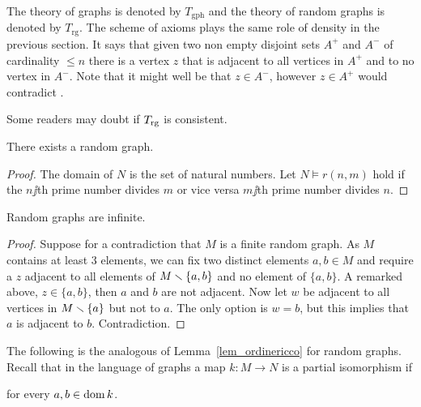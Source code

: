 \documentclass[creche.tex]{subfiles}
\begin{document}
The theory of graphs is denoted by \emph{$T_{\textrm{gph}}$} and the theory of random graphs is denoted by \emph{$T_{\textrm{rg}}$}. The scheme of axioms  plays the same role of density in the previous section.  It says that given two non empty disjoint sets $A^+$ and $A^-$ of cardinality $\le n$ there is a vertex $z$ that is adjacent to all vertices in $A^+$ and to no vertex in $A^-$. Note that it might well be that $z\in A^-$, however $z\in A^+$ would contradict .

Some readers may doubt if $T_{\rm rg}$ is consistent.

\begin{proposition}
There exists a random graph.
\end{proposition}
\begin{proof}
The domain of $N$ is the set of natural numbers. Let $N\models r(n,m)$ hold if the $n\jj$th prime number divides $m$ or vice versa $m\jj$th prime number divides $n$.
\end{proof}



\begin{proposition}
Random graphs are infinite.
\end{proposition}
\begin{proof}
Suppose for a contradiction that $M$ is a finite random graph. As $M$ contains at least $3$ elements, we can fix two distinct elements $a,b\in M$ and require a $z$ adjacent to all elements of $M\smallsetminus\{a,b\}$ and no element of $\{a,b\}$. A remarked above, $z\in\{a,b\}$, then $a$ and $b$ are not adjacent. Now let $w$ be adjacent to all vertices in $M\smallsetminus\{a\}$ but not to $a$. The only option is $w=b$, but this implies that $a$ is adjacent to $b$. Contradiction.
\end{proof}

The following is the analogous of Lemma~\ref{lem_ordinericco} for random graphs. Recall that in the language of graphs a map $k:M\to N$ is a partial isomorphism if

\hfill for every $a,b\in\mathop{\rm dom} k$.
\end{document}

